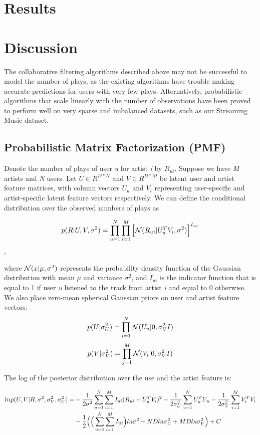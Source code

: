 \documentclass[11pt]{article}
\theoremstyle{definition}
\begin{document}
\section{\textbf{Results}}


\section{\textbf{Discussion}}
The collaborative filtering algorithms described above may not be  successful to model the number of plays, as the existing algorithms have trouble making accurate predictions for users with very few plays. Alternatively, probabilistic algorithms that scale linearly with the number of observations have been proved to perform well on very sparse and imbalanced datasets, such as our Streaming Music dataset.

\subsection{\textbf{Probabilistic Matrix Factorization (PMF)}}
Denote the number of plays of user \textit{u} for artist \textit{i} by $R_{ui}$. Suppose we have \textit{M} artists and \textit{N} users. Let $U \in R^{D*N}$ and $V \in R^{D*M}$ be latent user and artist feature matrices, with column vectors $U_u$ and $V_i$ representing user-specific and artist-specific latent feature vectors respectively. We can define the conditional distribution over the observed numbers of plays as

$$p(R|U, V, \sigma^2) = \prod_{u=1}^{N} \prod_{i=1}^M \Big[{\cal N}(R_{ui}|U_u^TV_i,\sigma^2) \Big]^{I_{ui}}$$,


where ${\cal N}(x|\mu,\sigma^2)$ represents the probability density function of the Gaussian distribution with mean $\mu$ and variance $\sigma^2$, and $I_{ui}$ is the indicator function that is equal to 1 if user \textit{u} listened to the track from artist \textit{i} and equal to 0 otherwise. We also place zero-mean spherical Gaussian priors on user and artist feature vectors:
$$p(U|\sigma_U^2) = \prod_{i=1}^N {\cal N}(U_u|0,\sigma_U^2 I)$$ 
$$p(V|\sigma_V^2)  = \prod_{j=1}^M {\cal N}(V_i|0,\sigma_V^2 I)$$

The log of the posterior distribution over the use and the artist feature is:

\begin{align*}
ln{\it{p}}(U,V|R,\sigma^2,\sigma_V^2,\sigma_U^2) =& 
-\frac{1}{2\sigma^2}\sum_{u=1}^N \sum_{i=1}^M I_{ui}(R_{ui} - U_u^TV_i)^2
-\frac{1}{2\sigma_U^2} \sum_{u=1}^N U_u^TU_u-\frac{1}{2\sigma_V^2}\sum_{i=1}^M V_i^TV_i 
\\
& -\frac{1}{2} \Big( \Big(\sum_{u=1}^N\sum_{i=1}^M I_{ui} \Big) ln\sigma^2 + NDln\sigma_U^2 + MDln\sigma_V^2 \Big) + C
\end{align*}
\end{document}
